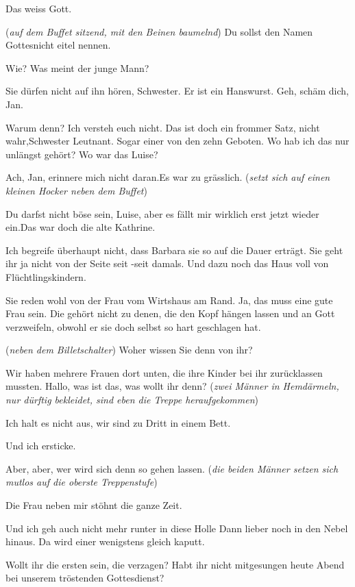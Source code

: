 \documentclass[
	final,
	a4paper,
	ngerman,
	mpinclude = true, %
	twoside = true,
	open = right,
	cleardoublepage = plain,
	DIV = 13,
	BCOR = 1cm,
	titlepage = firstiscover,
	]{scrbook}
\newcommand{\direction}[1]{(\textit{#1})}
\newcommand{\thecharacter}[1]{\textup{\textsc{#1}}\xspace}
\newcommand{\theGregor}{\thecharacter{Gregor}}
\newcommand{\theJan}{\thecharacter{Jan}}
\newcommand{\theLuise}{\thecharacter{Luise}}
\newcommand{\character}[1]{\item[#1]}
\newcommand{\Gregor}{\character{\theGregor}}
\newcommand{\Jan}{\character{\theJan}}
\newcommand{\Luise}{\character{\theLuise}}
\newcommand{\Heilsarmeeschwester}{\character{Schwester}}
\newcommand{\ErsterMann}{\character{1. Mann}}
\newcommand{\ZweiterMann}{\character{2. Mann}}
\begin{document}
\begin{play}
\Heilsarmeeschwester
Das weiss Gott.

\Jan \direction{auf dem Buffet sitzend, mit den Beinen baumelnd} Du sollst den Namen Gottesnicht eitel nennen.

\Heilsarmeeschwester
Wie? Was meint der junge Mann?

\Gregor
Sie dürfen nicht auf ihn hören, Schwester. Er ist ein Hanswurst. Geh, schäm dich, Jan.

\Jan
Warum denn? Ich versteh euch nicht. Das ist doch ein frommer Satz, nicht wahr,Schwester Leutnant. Sogar einer von den zehn Geboten. Wo hab ich das nur unlängst gehört? Wo war das Luise?

\Luise
Ach, Jan, erinnere mich nicht daran.Es war zu grässlich. \direction{setzt sich auf einen kleinen Hocker neben dem Buffet}

\Jan
Du darfst nicht böse sein, Luise, aber es fällt mir wirklich erst jetzt wieder ein.Das war doch die alte Kathrine.

\Luise
Ich begreife überhaupt nicht, dass Barbara sie so auf die Dauer erträgt. Sie geht ihr ja nicht von der Seite seit -seit damals. Und dazu noch das Haus voll von Flüchtlingskindern.

\Heilsarmeeschwester
Sie reden wohl von der Frau vom Wirtshaus am Rand. Ja, das muss eine gute Frau sein. Die gehört nicht zu denen, die den Kopf hängen lassen und an Gott verzweifeln, obwohl er sie doch selbst so hart geschlagen hat.

\Gregor
\direction{neben dem Billetschalter} Woher wissen Sie denn von ihr?

\Heilsarmeeschwester
Wir haben mehrere Frauen dort unten, die ihre Kinder bei ihr zurücklassen mussten. Hallo, was ist das, was wollt ihr denn? \direction{zwei Männer in Hemdärmeln, nur dürftig bekleidet, sind eben die Treppe heraufgekommen}

\ErsterMann
Ich halt es nicht aus, wir sind zu Dritt in einem Bett.

\ZweiterMann
Und ich ersticke.

\Heilsarmeeschwester
Aber, aber, wer wird sich denn so gehen lassen. \direction{die beiden Männer setzen sich mutlos auf die oberste Treppenstufe}

\ErsterMann
Die Frau neben mir stöhnt die ganze Zeit.

\ZweiterMann
Und ich geh auch nicht mehr runter in diese Holle Dann lieber noch in den Nebel hinaus. Da wird einer wenigstens gleich kaputt.

\Heilsarmeeschwester
Wollt ihr die ersten sein, die verzagen? Habt ihr nicht mitgesungen heute Abend bei unserem tröstenden Gottesdienst?


\end{play}
\end{document}
